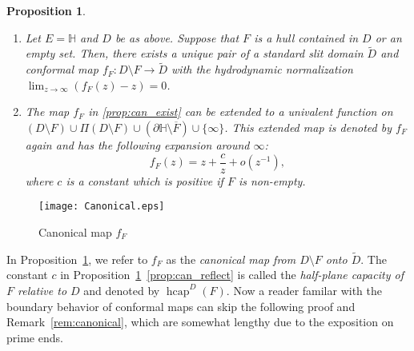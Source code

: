\documentclass[preprint,12pt]{elsarticle}
\newtheorem{prop}[thm]{Proposition}
\theoremstyle{definition}
\newcommand{\uhp}{\mathbb{H}}
\DeclareMathOperator{\hcap}{hcap}
\begin{document}
\begin{prop}
\label{prop:canonical}
\begin{enumerate}

\item \label{prop:can_exist}
Let $E=\uhp$ and $D$ be as above.
Suppose that $F$ is a hull contained in $D$ or an empty set.
Then, there exists a unique pair of a standard slit domain $\tilde{D}$ and
conformal map $f_F \colon D \setminus F \to \tilde{D}$
with the hydrodynamic normalization
$\lim_{z \to \infty} (f_F(z)-z)=0$.

\item \label{prop:can_reflect}
The map $f_F$ in \eqref{prop:can_exist} can be extended to a univalent function on
$(D \setminus F) \cup \Pi(D \setminus F)
\cup (\partial \uhp \setminus \overline{F}) \cup \{\infty\}$.
This extended map is denoted by $f_F$ again
and has the following expansion around $\infty$:
\begin{equation} \label{eq:can_expand}
f_F(z)=z + \frac{c}{z} + o(z^{-1}),
\end{equation}
where $c$ is a constant which is positive if $F$ is non-empty.
\end{enumerate}
\end{prop}

\begin{figure}
\centering
\texttt{[image: Canonical.eps]}
\caption{Canonical map $f_F$}
\end{figure}

In Proposition~\ref{prop:canonical}, we refer to $f_F$
as the \emph{canonical map from $D \setminus F$ onto $\tilde{D}$}.
The constant $c$ in Proposition~\ref{prop:canonical}~\eqref{prop:can_reflect}
is called the \emph{half-plane capacity of $F$ relative to $D$}
and denoted by $\hcap^D(F)$.
Now a reader familar with the boundary behavior of conformal maps
can skip the following proof and Remark~\ref{rem:canonical},
which are somewhat lengthy due to the exposition on prime ends.
\end{document}
